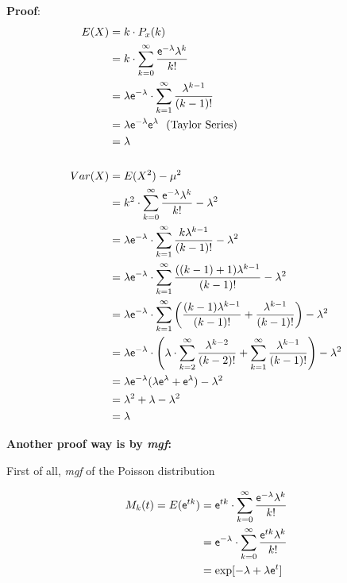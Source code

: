\documentclass[12pt]{article}
\begin{document}
\textbf{Proof}:
$$
\begin{aligned}[t]
E(X) 
	&= k \cdot P_x (k) \\
    &= k \cdot \sum_{k=0} ^{\infty}  \frac {\mathsf{e}^{-\lambda} \lambda^k } {k!} \\
    &= \lambda \mathsf{e}^{-\lambda}  \cdot \sum_{k=1} ^{\infty}  \frac { \lambda^{k-1}} {(k-1)!} \\
    &= \lambda \mathsf{e}^{-\lambda} \mathsf{e}^\lambda \text {\    \  (Taylor Series) } \\
    &= \lambda \\
    \\
Var(X)
	&= E(X^2) - \mu^2 \\  
	&= k^2 \cdot \sum_{k=0} ^{\infty}  \frac {\mathsf{e}^{-\lambda} \lambda^k } {k!} - \lambda^2 \\
	&=  \lambda \mathsf{e}^{-\lambda}  \cdot \sum_{k=1} ^{\infty}  \frac { k \lambda^{k-1}} {(k-1)!} - \lambda^2 \\
	&=  \lambda \mathsf{e}^{-\lambda}  \cdot \sum_{k=1} ^{\infty}  \frac { ((k-1)+1) \lambda^{k-1}} {(k-1)!} - \lambda^2 \\
	&=  \lambda \mathsf{e}^{-\lambda}  \cdot \sum_{k=1} ^{\infty}  \left( \frac { (k-1) \lambda^{k-1}} {(k-1)!} + \frac { \lambda^{k-1}} {(k-1)!} \right) - \lambda^2 \\
	&=  \lambda \mathsf{e}^{-\lambda}  \cdot  \left( \lambda \cdot \sum_{k=2} ^{\infty} \frac { \lambda^{k-2}} {(k-2)!} + \sum_{k=1} ^{\infty} \frac { \lambda^{k-1}} {(k-1)!} \right) - \lambda^2 \\
	&= \lambda \mathsf{e}^{-\lambda} (\lambda \mathsf{e}^\lambda + \mathsf{e}^\lambda ) - \lambda^2 \\
	&= \lambda^2 + \lambda - \lambda^2 \\
	&= \lambda \\
 \end{aligned}\\     
$$

\textbf{Another proof way is by \textit{mgf}:} 

First of all,  \textit{mgf} of the Poisson distribution

$$
\begin{aligned}[t]
M_k (t) = E(\mathsf{e}^{tk})
	&=  \mathsf{e}^{tk} \cdot \sum_{k=0} ^{\infty}  \frac {\mathsf{e}^{-\lambda} \lambda^k } {k!} \\
	&=  \mathsf{e}^{-\lambda} \cdot \sum_{k=0} ^{\infty}  \frac {\mathsf{e}^{tk} \lambda^k } {k!} \\
	&= \exp [-\lambda +\lambda \mathsf{e}^t] \\ 
 \end{aligned}\\     
$$
\end{document}
